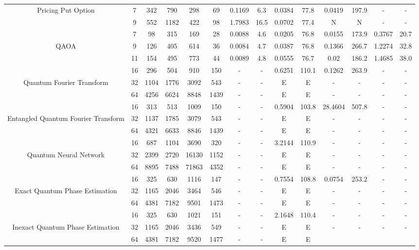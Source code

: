 \begin{table}[htb]
{\begin{tabular}{|c|c|c|c|c|c|c|c|c|c|c|c|c|c|}
Pricing Put Option & 
7 & 342 & 790 & 298 & 69
 & 0.1169 & 6.3
 & 0.0384 & 77.8
 & 0.0419 & 197.9
 & - & -
 \\
 & 
9 & 552 & 1182 & 422 & 98
 & 1.7983 & 16.5
 & 0.0702 & 77.4
 & N & N 
 & - & -
 \\
\hline
 & 
7 & 98 & 315 & 169 & 28
 & 0.0088 & 4.6
 & 0.0205 & 76.8
 & 0.0155 & 173.9
 & 0.3767 & 20.7
 \\
QAOA & 
9 & 126 & 405 & 614 & 36
 & 0.0084 & 4.7
 & 0.0387 & 76.8
 & 0.1366 & 266.7
 & 1.2274 & 32.8
 \\
 & 
11 & 154 & 495 & 773 & 44
 & 0.0089 & 4.8
 & 0.0555 & 76.7
 & 0.02 & 186.2
 & 1.4685 & 38.0
 \\
\hline
 & 
16 & 296 & 504 & 910 & 150
 & - & -
 & 0.6251 & 110.1
 & 0.1262 & 263.9
 & - & -
 \\
Quantum Fourier Transform & 
32 & 1104 & 1776 & 3092 & 543
 & - & -
 & E & E
 & - & -
 & - & -
 \\
 & 
64 & 4256 & 6624 & 8848 & 1439
 & - & -
 & E & E
 & - & -
 & - & -
 \\
\hline
 & 
16 & 313 & 513 & 1009 & 150
 & - & -
 & 0.5904 & 103.8
 & 28.4604 & 507.8
 & - & -
 \\
Entangled Quantum Fourier Transform & 
32 & 1137 & 1785 & 3079 & 543
 & - & -
 & E & E
 & - & -
 & - & -
 \\
 & 
64 & 4321 & 6633 & 8846 & 1439
 & - & -
 & E & E
 & - & -
 & - & -
 \\
\hline
 & 
16 & 687 & 1104 & 3690 & 320
 & - & -
 & 3.2144 & 110.9
 & - & -
 & - & -
 \\
Quantum Neural Network & 
32 & 2399 & 2720 & 16130 & 1152
 & - & -
 & E & E
 & - & -
 & - & -
 \\
 & 
64 & 8895 & 7488 & 71863 & 4352
 & - & -
 & E & E
 & - & -
 & - & -
 \\
\hline
 & 
16 & 325 & 630 & 1116 & 147
 & - & -
 & 0.7554 & 108.8
 & 0.0754 & 253.2
 & - & -
 \\
Exact Quantum Phase Estimation & 
32 & 1165 & 2046 & 3464 & 546
 & - & -
 & E & E
 & - & -
 & - & -
 \\
 & 
64 & 4381 & 7182 & 9501 & 1473
 & - & -
 & E & E
 & - & -
 & - & -
 \\
\hline
 & 
16 & 325 & 630 & 1021 & 151
 & - & -
 & 2.1648 & 110.4
 & - & -
 & - & -
 \\
Inexact Quantum Phase Estimation & 
32 & 1165 & 2046 & 3436 & 549
 & - & -
 & E & E
 & - & -
 & - & -
 \\
 & 
64 & 4381 & 7182 & 9520 & 1477
 & - & -
 & E & E

\end{tabular}}
\end{table}
